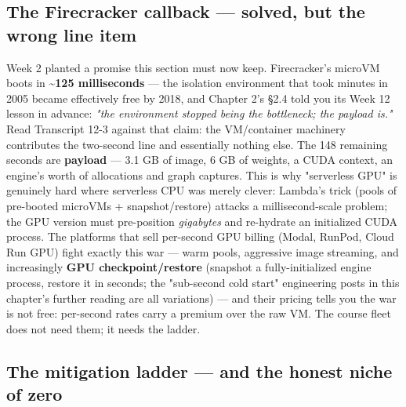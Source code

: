 \subsection*{The Firecracker callback — solved, but the wrong line item}

Week 2 planted a promise this section must now keep. Firecracker's microVM boots in \textbf{\textasciitilde{}125 milliseconds} — the isolation environment that took minutes in 2005 became effectively free by 2018, and Chapter 2's §2.4 told you its Week 12 lesson in advance: \textit{"the environment stopped being the bottleneck; the payload is."} Read Transcript 12-3 against that claim: the VM/container machinery contributes the two-second  line and essentially nothing else. The 148 remaining seconds are \textbf{payload} — 3.1 GB of image, 6 GB of weights, a CUDA context, an engine's worth of allocations and graph captures. This is why "serverless GPU" is genuinely hard where serverless CPU was merely clever: Lambda's trick (pools of pre-booted microVMs + snapshot/restore) attacks a millisecond-scale problem; the GPU version must pre-position \textit{gigabytes} and re-hydrate an initialized CUDA process. The platforms that sell per-second GPU billing (Modal, RunPod, Cloud Run GPU) fight exactly this war — warm pools, aggressive image streaming, and increasingly \textbf{GPU checkpoint/restore} (snapshot a fully-initialized engine process, restore it in seconds; the "sub-second cold start" engineering posts in this chapter's further reading are all variations) — and their pricing tells you the war is not free: per-second rates carry a premium over the raw VM. The course fleet does not need them; it needs the ladder.

\subsection*{The mitigation ladder — and the honest niche of zero}

